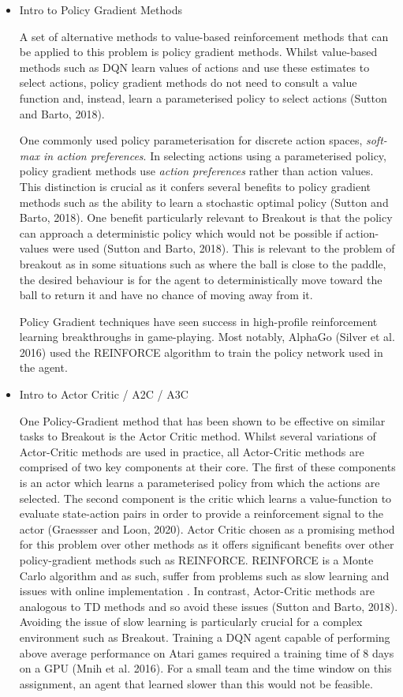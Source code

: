 \documentclass{article}
\begin{document}
\begin{itemize}
\item Intro to Policy Gradient Methods

A set of alternative methods to value-based reinforcement methods that can be applied to this problem is policy gradient methods. Whilst value-based methods such as DQN learn values of actions and use these estimates to select actions, policy gradient methods do not need to consult a value function and, instead, learn a parameterised policy to select actions (Sutton and Barto, 2018).

One commonly used policy parameterisation for discrete action spaces, \emph{soft-max in action preferences}. In selecting actions using a parameterised policy, policy gradient methods use \emph{action preferences} rather than action values. This distinction is crucial as it confers several benefits to policy gradient methods such as the ability to learn a stochastic optimal policy (Sutton and Barto, 2018). One benefit particularly relevant to Breakout is that the policy can approach a deterministic policy which would not be possible if action-values were used (Sutton and Barto, 2018). This is relevant to the problem of breakout as in some situations such as where the ball is close to the paddle, the desired behaviour is for the agent to deterministically move toward the ball to return it and have no chance of moving away from it.

Policy Gradient techniques have seen success in high-profile reinforcement learning breakthroughs in game-playing. Most notably, AlphaGo (Silver et al. 2016) used the REINFORCE algorithm to train the policy network used in the agent.

\item Intro to Actor Critic / A2C / A3C

One Policy-Gradient method that has been shown to be effective on similar tasks to Breakout is the Actor Critic method. Whilst several variations of Actor-Critic methods are used in practice, all Actor-Critic methods are comprised of two key components at their core. The first of these components is an actor which learns a parameterised policy from which the actions are selected. The second component is the critic which learns a value-function to evaluate state-action pairs in order to provide a reinforcement signal to the actor (Graessser and Loon, 2020). Actor Critic chosen as a promising method for this problem over other methods as it offers significant benefits over other policy-gradient methods such as REINFORCE. REINFORCE is a Monte Carlo  algorithm and as such, suffer from problems such as slow learning and issues with online implementation . In contrast, Actor-Critic methods are analogous to TD methods and so avoid these issues (Sutton and Barto, 2018). Avoiding the issue of slow learning is particularly crucial for a complex environment such as Breakout. Training a DQN agent capable of performing above average performance on Atari games required a training time of 8 days on a GPU (Mnih et al. 2016). For a small team and the time window on this assignment, an agent that learned slower than this would not be feasible.


\end{itemize}
\end{document}
